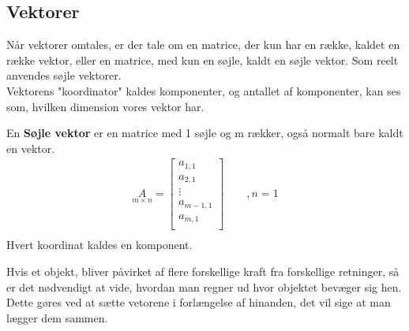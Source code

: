 \subsection{Vektorer}
Når vektorer omtales, er der tale om en matrice, der kun har en række, kaldet en række vektor, eller en matrice, med kun en søjle, kaldt en søjle vektor. Som reelt anvendes søjle vektorer. \\
Vektorens "koordinator" kaldes komponenter, og antallet af komponenter, kan ses som, hvilken dimension vores vektor har.
\begin{defn}
En \textbf{Søjle vektor} er en matrice med 1 søjle og m rækker, også normalt bare kaldt en vektor.
\begin{align*}
\underset{m \times n}{A} = 
\begin{bmatrix}
a_{1,1}\\
a_{2,1}\\
\vdots \\
a_{m-1,1}\\
a_{m,1} \\
\end{bmatrix}\qquad , n=1\\ %
\end{align*} 
Hvert koordinat kaldes en komponent.
\end{defn}
Hvis et objekt, bliver påvirket af flere forskellige kraft fra forskellige retninger, så er det nødvendigt at vide, hvordan man regner ud hvor objektet bevæger sig hen. Dette gøres ved at sætte vetorene i forlængelse af hinanden, det vil sige at man lægger dem sammen. 
